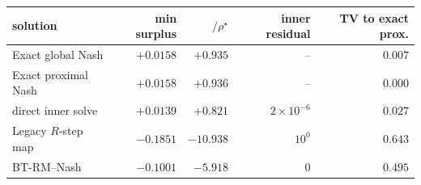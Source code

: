 \begin{tabular}{lrrrr}
\toprule
solution & min surplus & $/\rho^\star$ & inner residual & TV to exact prox.\\
\midrule
Exact global Nash & $+0.0158$ & $+0.935$ & -- & $0.007$\\
Exact proximal Nash & $+0.0158$ & $+0.936$ & -- & $0.000$\\
\NBPO{} direct inner solve & $+0.0139$ & $+0.821$ & $2\times10^{-6}$ & $0.027$\\
Legacy $R$-step map & $-0.1851$ & $-10.938$ & $10^{0}$ & $0.643$\\
BT-RM--Nash & $-0.1001$ & $-5.918$ & $0$ & $0.495$\\
\bottomrule
\end{tabular}
